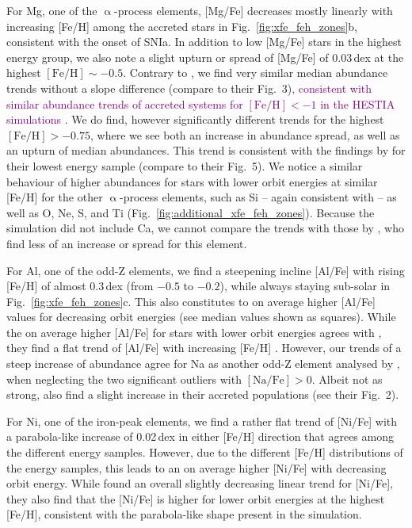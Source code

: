 \documentclass[fleqn,usenatbib]{mnras}
\newcommand{\changed}[1]{{\textcolor{purple}{#1}}}
\begin{document}
For Mg, one of the $\upalpha$-process elements, [Mg/Fe] decreases mostly linearly with increasing [Fe/H] among the accreted stars in Fig.~\ref{fig:xfe_feh_zones}b, consistent with the onset of SNIa. In addition to low [Mg/Fe] stars in the highest energy group, we also note a slight upturn or spread of [Mg/Fe] of 0.03\,dex at the highest $\mathrm{[Fe/H]} \sim -0.5$. Contrary to \citet{Skuladottir2025}, we find very similar median abundance trends without a slope difference (compare to their Fig.~3)\changed{, consistent with similar abundance trends of accreted systems for $\mathrm{[Fe/H] < -1}$ in the HESTIA simulations \citep{Khoperskov2023c}}. We do find, however significantly different trends for the highest $\mathrm{[Fe/H]} > -0.75$, where we see both an increase in abundance spread, as well as an upturn of median abundances. This trend is consistent with the findings by \citet{Skuladottir2025} for their lowest energy sample (compare to their Fig.~5). We notice a similar behaviour of higher abundances for stars with lower orbit energies at similar [Fe/H] for the other $\upalpha$-process elements, such as Si -- again consistent with \citet{Skuladottir2025} -- as well as O, Ne, S, and Ti (Fig.~\ref{fig:additional_xfe_feh_zones}). Because the simulation did not include Ca, we cannot compare the trends with those by \citet{Skuladottir2025}, who find less of an increase or spread for this element.

For Al, one of the odd-Z elements, we find a steepening incline [Al/Fe] with rising [Fe/H] of almost 0.3\,dex (from $-0.5$ to $-0.2$), while always staying sub-solar in Fig.~\ref{fig:xfe_feh_zones}c. This also constitutes to on average higher [Al/Fe] values for decreasing orbit energies (see median values shown as squares). While the on average higher [Al/Fe] for stars with lower orbit energies agrees with \citet{Skuladottir2025}, they find a flat trend of [Al/Fe] with increasing [Fe/H] \citep[see also][]{Feuillet2021, Ernandes2025}. However, our trends of a steep increase of abundance agree for Na as another odd-Z element analysed by \citet[][see their Fig.~6]{Skuladottir2025}, when neglecting the two significant outliers with $\mathrm{[Na/Fe]} > 0$. Albeit not as strong, \citet{Belokurov2022} also find a slight increase in their accreted populations (see their Fig.~2).

For Ni, one of the iron-peak elements, we find a rather flat trend of [Ni/Fe] with a parabola-like increase of 0.02\,dex in either [Fe/H] direction that agrees among the different energy samples. However, due to the different [Fe/H] distributions of the energy samples, this leads to an on average higher [Ni/Fe] with decreasing orbit energy. While \citet{Skuladottir2025} found an overall slightly decreasing linear trend for [Ni/Fe], they also find that the [Ni/Fe] is higher for lower orbit energies at the highest [Fe/H], consistent with the parabola-like shape present in the simulation.
\end{document}
